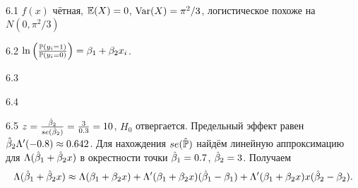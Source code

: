 \protect \hypertarget {soln:6.1}{}
\begin{solution}{{6.1}}
$f(x)$ чётная, $\E(X)=0$, $\Var(X)=\pi^2/3$, логистическое похоже на $N(0,\pi^2/3)$
\end{solution}
\protect \hypertarget {soln:6.2}{}
\begin{solution}{{6.2}}
$\ln \left(\frac{\P(y_i=1)}{\P(y_i=0)} \right)=\beta_1+\beta_2 x_i$.
\end{solution}
\protect \hypertarget {soln:6.3}{}
\begin{solution}{{6.3}}
\end{solution}
\protect \hypertarget {soln:6.4}{}
\begin{solution}{{6.4}}
\end{solution}
\protect \hypertarget {soln:6.5}{}
\begin{solution}{{6.5}}
$z = \frac{\hb_2}{se(\hb_2)}=\frac{3}{0.3}=10$, $H_0$ отвергается.
Предельный эффект равен $\hb_2 \Lambda'(-0.8)\approx 0.642$.
Для нахождения $se(\hat\P)$ найдём линейную аппроксимацию для $\Lambda(\hb_1 + \hb_2 x)$ в окрестности точки $\hb_1=0.7$, $\hb_2=3$. Получаем
\[
\Lambda(\hb_1 + \hb_2 x) \approx \Lambda(\beta_1 + \beta_2 x) + \Lambda'(\beta_1 + \beta_2 x) (\hb_1 - \beta_1) + \Lambda'(\beta_1 + \beta_2 x)x(\hb_2 - \beta_2).
\]
\end{solution}
\protect \hypertarget {soln:6.6}{}

